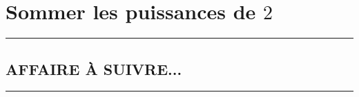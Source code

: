 \documentclass[12pt]{amsbook}
\begin{document}


\setcounter{tocdepth}{1}
\tableofcontents




\chapter{Sommer les puissances de $2$}




%
%
%
%









\bigskip

\hrule

\section{AFFAIRE À SUIVRE...}

\bigskip

\hrule
\end{document}

